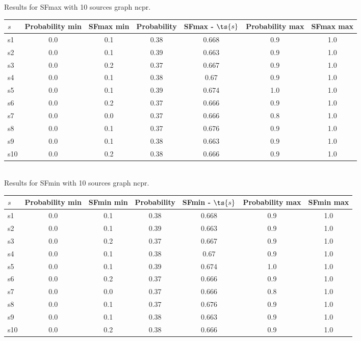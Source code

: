 \documentclass{article}
\begin{document}
\noindent Results for SFmax with 10 sources graph ncpr.

\noindent\begin{tabular}{|l|c|c|c|c|c|c|}
\hline
$s$& Probability min & SFmax min & Probability & SFmax - $\ts{s}$ & Probability max & SFmax max\\
\hline
s1 &0.0 & 0.1 & 0.38 & 0.668 & 0.9 & 1.0\\
\hline
s2 &0.0 & 0.1 & 0.39 & 0.663 & 0.9 & 1.0\\
\hline
s3 &0.0 & 0.2 & 0.37 & 0.667 & 0.9 & 1.0\\
\hline
s4 &0.0 & 0.1 & 0.38 & 0.67 & 0.9 & 1.0\\
\hline
s5 &0.0 & 0.1 & 0.39 & 0.674 & 1.0 & 1.0\\
\hline
s6 &0.0 & 0.2 & 0.37 & 0.666 & 0.9 & 1.0\\
\hline
s7 &0.0 & 0.0 & 0.37 & 0.666 & 0.8 & 1.0\\
\hline
s8 &0.0 & 0.1 & 0.37 & 0.676 & 0.9 & 1.0\\
\hline
s9 &0.0 & 0.1 & 0.38 & 0.663 & 0.9 & 1.0\\
\hline
s10 &0.0 & 0.2 & 0.38 & 0.666 & 0.9 & 1.0\\
\hline
\end{tabular}\\

\noindent Results for SFmin with 10 sources graph ncpr.

\noindent\begin{tabular}{|l|c|c|c|c|c|c|}
\hline
$s$& Probability min & SFmin min & Probability & SFmin - $\ts{s}$ & Probability max & SFmin max\\
\hline
s1 &0.0 & 0.1 & 0.38 & 0.668 & 0.9 & 1.0\\
\hline
s2 &0.0 & 0.1 & 0.39 & 0.663 & 0.9 & 1.0\\
\hline
s3 &0.0 & 0.2 & 0.37 & 0.667 & 0.9 & 1.0\\
\hline
s4 &0.0 & 0.1 & 0.38 & 0.67 & 0.9 & 1.0\\
\hline
s5 &0.0 & 0.1 & 0.39 & 0.674 & 1.0 & 1.0\\
\hline
s6 &0.0 & 0.2 & 0.37 & 0.666 & 0.9 & 1.0\\
\hline
s7 &0.0 & 0.0 & 0.37 & 0.666 & 0.8 & 1.0\\
\hline
s8 &0.0 & 0.1 & 0.37 & 0.676 & 0.9 & 1.0\\
\hline
s9 &0.0 & 0.1 & 0.38 & 0.663 & 0.9 & 1.0\\
\hline
s10 &0.0 & 0.2 & 0.38 & 0.666 & 0.9 & 1.0\\
\hline
\end{tabular}\\
\end{document}
